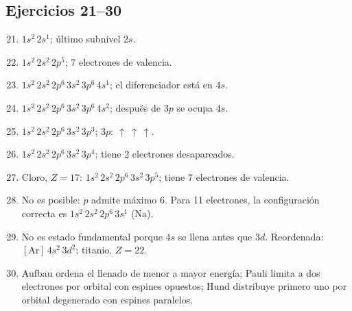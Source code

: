 \documentclass[12pt, letterpaper]{article}
\begin{document}
\subsection*{Ejercicios 21--30}
\begin{enumerate}[leftmargin=*, label=\textbf{\arabic*.}]
  \setcounter{enumi}{20}
  \item $1s^2\,2s^1$; último subnivel $2s$.
  \item $1s^2\,2s^2\,2p^5$; 7 electrones de valencia.
  \item $1s^2\,2s^2\,2p^6\,3s^2\,3p^6\,4s^1$; el diferenciador está en $4s$.
  \item $1s^2\,2s^2\,2p^6\,3s^2\,3p^6\,4s^2$; después de $3p$ se ocupa $4s$.
  \item $1s^2\,2s^2\,2p^6\,3s^2\,3p^3$; $3p:\ \boxed{\uparrow}\ \boxed{\uparrow}\ \boxed{\uparrow}$.
  \item $1s^2\,2s^2\,2p^6\,3s^2\,3p^4$; tiene 2 electrones desapareados.
  \item Cloro, $Z=17$: $1s^2\,2s^2\,2p^6\,3s^2\,3p^5$; tiene 7 electrones de valencia.
  \item No es posible: $p$ admite máximo 6. Para 11 electrones, la configuración correcta es $1s^2\,2s^2\,2p^6\,3s^1$ (Na).
  \item No es estado fundamental porque $4s$ se llena antes que $3d$. Reordenada: $[\mathrm{Ar}]\,4s^2\,3d^2$; titanio, $Z=22$.
  \item Aufbau ordena el llenado de menor a mayor energía; Pauli limita a dos electrones por orbital con espines opuestos; Hund distribuye primero uno por orbital degenerado con espines paralelos.
\end{enumerate}
\end{document}
